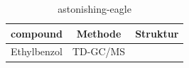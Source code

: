 \begin{table}[htbp]
    \centering
    \caption{astonishing-eagle}
    \label{tab:enchanted-falcon}
    \begin{tabular}{ccc}
        \toprule
        {compound} & {Methode} & {Struktur} \\
        \midrule
        Ethylbenzol & TD-GC/MS & \tiny{} \\
        \bottomrule
    \end{tabular}
\end{table}